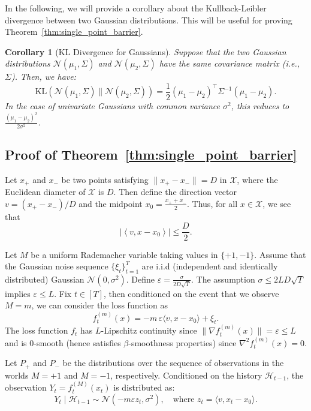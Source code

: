 \documentclass[journal,onecolumn]{IEEEtran}
\newcommand{\cX}{\mathcal{X}}
\theoremstyle{plain}
\newtheorem{corollary}[theorem]{Corollary}
\theoremstyle{definition}
\theoremstyle{remark}
\newcommand{\inner}[2]{\left\langle #1, #2 \right\rangle}
\begin{document}
{In the following, we will provide a corollary about the Kullback-Leibler divergence between two Gaussian distributions. This will be useful for proving Theorem~\ref{thm:single_point_barrier}.


\begin{corollary}[KL Divergence for Gaussians]
\label{fact:kl-gaussian}
Suppose that the two Gaussian distributions $ \mathcal{N}(\mu_1,\Sigma)$ and $ \mathcal{N}(\mu_2,\Sigma)$ have the same covariance matrix (i.e., $ \Sigma$). Then, we have:
\begin{equation*}
    \mathrm{KL}(\mathcal{N}(\mu_1, \Sigma) \| \mathcal{N}(\mu_2, \Sigma)) = \frac{1}{2} (\mu_1 - \mu_2)^\top \Sigma^{-1} (\mu_1 - \mu_2).
\end{equation*}
In the case of univariate Gaussians with common variance $\sigma^2$, this reduces to $\frac{(\mu_1 - \mu_2)^2}{2\sigma^2}$.
\end{corollary}

\subsection{Proof of Theorem~\ref{thm:single_point_barrier}}

Let $x_{+}$ and $x_{-}$ be two points satisfying $\|x_{+}-x_{-}\|=D$ in $\cX$, where the Euclidean diameter of $\cX$ is $D$. Then define the direction vector $v=(x_{+}-x_{-})/D$ and the midpoint $x_0=\frac{x_{+}+x_{-}}{2}$. Thus, for all $x\in \cX$, we see that 
\[
|\inner{v}{x-x_0}| \leq \frac{D}{2}.
\]

Let $M$ be a uniform Rademacher variable taking values in $\{+1,-1\}$. Assume that the Gaussian noise sequence $\{\xi_t\}_{t=1}^T$ are i.i.d (independent and identically distributed) Gaussian $\mathcal{N}(0,\sigma^2)$. Define $\varepsilon=\frac{\sigma}{2D\sqrt{T}}$. The assumption $\sigma \leq 2LD\sqrt{T}$ implies $\varepsilon \leq L$. Fix $t\in[T]$, then conditioned on the event that we observe $M=m$, we can consider the loss function as
\[
f_t^{(m)}(x)=-m\,\varepsilon\langle v,x-x_0\rangle+\xi_t .
\]
The loss function $f_t$ has $L$-Lipschitz continuity since $\|\nabla f_t^{(m)}(x)\|=\varepsilon \le L$ and is $0$-smooth (hence satisfies $\beta$-smoothness properties) since $\nabla^{2}f_t^{(m)}(x)=0$.

Let $P_+$ and $P_-$ be the distributions over the sequence of observations in the worlds $M=+1$ and $M=-1$, respectively.
Conditioned on the history $\mathcal{H}_{t-1}$, the observation $Y_t = f_t^{(M)}(x_t)$ is distributed as:
\begin{equation*}
Y_t \mid \mathcal{H}_{t-1} \sim \mathcal{N}(-m\varepsilon z_t, \sigma^2), \quad \text{where } z_t= \langle v, x_t - x_0 \rangle.
\end{equation*}

}
\end{document}
